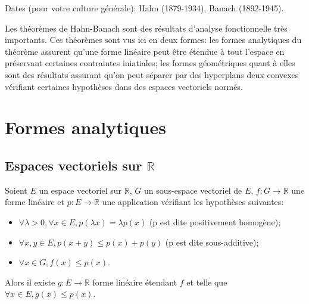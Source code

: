 Dates (pour votre culture générale): Hahn (1879-1934), Banach (1892-1945).

Les théorèmes de Hahn-Banach sont des résultats d'analyse fonctionnelle
très importants. Ces théorèmes sont vus ici en deux formes:
les formes analytiques du théorème assurent qu'une forme linéaire
peut être étendue à tout l'espace en préservant certaines contraintes
iniatiales; les formes géométriques quant à elles sont des résultats
assurant qu'on peut séparer par des hyperplans deux convexes vérifiant
certaines hypothèses dans des espaces vectoriels normés.

\section{Formes analytiques}
\subsection{Espaces vectoriels sur $\mathbb{R}$}

\begin{thm} \label{hb:a1}
Soient $E$ un espace vectoriel sur $\mathbb{R}$, $G$ un sous-espace
vectoriel de $E$, $f: G \to \mathbb{R}$ une forme linéaire
et $p: E\to \mathbb{R}$ une application vérifiant les hypothèses suivantes:
\begin{itemize}
\item $\forall\lambda >0, \forall x \in E, p(\lambda x)=\lambda p(x)$
  (p est dite positivement homogène);
\item $\forall x,y \in E, p(x+y)\leq p(x)+p(y)$
  (p est dite sous-additive);
\item$\forall x\in G, f(x)\leq p(x)$.
\end{itemize}
Alors il existe $g:E\to\mathbb{R}$ forme linéaire étendant $f$ et telle
que $\forall x \in E, g(x)\leq p(x)$.
\end{thm}

